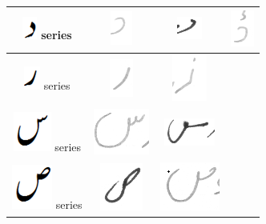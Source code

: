 \documentclass[a4paper,conference]{IEEEtran}
\begin{document}
\begin{table}[h]
\begin{tabular}{@{}cccc@{}}
\hline
\includegraphics[scale=0.25]{daal_orig} series & \includegraphics[scale=0.15]{89} & \includegraphics[scale=0.15]{90}  & \includegraphics[scale=0.15]{91} \\
\hline
\includegraphics[scale=0.25]{re_orig} series & \includegraphics[scale=0.15]{92} & \includegraphics[scale=0.15]{93}  &  \\
\hline
\includegraphics[scale=0.25]{seen_orig} series & \includegraphics[scale=0.15]{94} & \includegraphics[scale=0.15]{95}  &  \\
\hline
\includegraphics[scale=0.20]{suad_orig} series & \includegraphics[scale=0.15]{96} & \includegraphics[scale=0.15]{97}  &  \\

\end{tabular}
\end{table}
\end{document}
